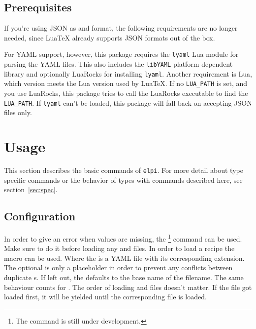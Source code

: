 \documentclass{ltxdoc}
\begin{document}
    \subsection{Prerequisites}
    If you're using JSON as  and  format, the following requirements are no longer needed, since Lua\TeX{} already supports JSON formats out of the box.

    For YAML support, however, this package requires the \texttt{lyaml}\cite{lyaml} Lua module for parsing the YAML files.
    This also includes the \texttt{libYAML}\cite{libYAML} platform dependent library and optionally LuaRocks for installing \texttt{lyaml}.
    Another requirement is Lua, which version meets the Lua version used by Lua\TeX{}.
    If no \texttt{LUA\_PATH} is set, and you use LuaRocks, this package tries to call the LuaRocks executable to find the \texttt{LUA\_PATH}.
    If \texttt{lyaml} can't be loaded, this package will fall back on accepting JSON files only.

    \clearpage
    \section{Usage}
    This section describes the basic commands of \texttt{elpi}.
    For more detail about type specific commands or the behavior of types with commands described here, see section~\ref{sec:spec}.\\

    \subsection{Configuration}
    \DescribeMacro{\strictparams} In order to give an error when values are missing, the \cmd{\strictparams}\footnote{The \cmd{\strictparams} command is still under development.} command can be used.
    Make sure to do it before loading any  and  files.
    \DescribeMacro{\loadrecipe}
    In order to load a recipe the macro \cmd{\loadrecipe} can be used.
    Where the  is a YAML file with its corresponding extension.
    The optional  is only a placeholder in order to prevent any conflicts between duplicate s.
    If left out, the  defaults to the base name of the filename.
    \DescribeMacro{\loadpayload} The same behaviour counts for \cmd{\loadpayload}.
    The order of loading  and  files doesn't matter.
    If the  file got loaded first, it will be yielded until the corresponding  file is loaded.
\end{document}
